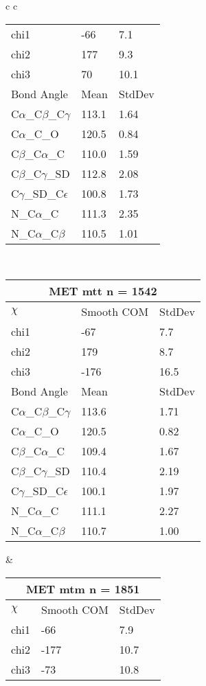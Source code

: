 \begin{longtable}{ c c }
\begin{tabular}{ l l l }
  chi1 & -66 & 7.1 \\ 
  chi2 & 177 & 9.3 \\ 
  chi3 & 70 & 10.1 \\ \midrule
  Bond Angle   & Mean     & StdDev \\ \midrule
  C$\alpha$\_C$\beta$\_C$\gamma$ & 113.1 & 1.64\\
  C$\alpha$\_C\_O & 120.5 & 0.84\\
  C$\beta$\_C$\alpha$\_C & 110.0 & 1.59\\
  C$\beta$\_C$\gamma$\_SD & 112.8 & 2.08\\
  C$\gamma$\_SD\_C$\epsilon$ & 100.8 & 1.73\\
  N\_C$\alpha$\_C & 111.3 & 2.35\\
  N\_C$\alpha$\_C$\beta$ & 110.5 & 1.01\\
  \bottomrule
  \end{tabular}
  \\
  \begin{tabular}{ l l l }
  \toprule
  \multicolumn{3}{c}{MET \textbf{mtt} n = 1542} \\ \toprule
  $\chi$       & Smooth COM & StdDev \\ \midrule
  chi1 & -67 & 7.7 \\ 
  chi2 & 179 & 8.7 \\ 
  chi3 & -176 & 16.5 \\ \midrule
  Bond Angle   & Mean     & StdDev \\ \midrule
  C$\alpha$\_C$\beta$\_C$\gamma$ & 113.6 & 1.71\\
  C$\alpha$\_C\_O & 120.5 & 0.82\\
  C$\beta$\_C$\alpha$\_C & 109.4 & 1.67\\
  C$\beta$\_C$\gamma$\_SD & 110.4 & 2.19\\
  C$\gamma$\_SD\_C$\epsilon$ & 100.1 & 1.97\\
  N\_C$\alpha$\_C & 111.1 & 2.27\\
  N\_C$\alpha$\_C$\beta$ & 110.7 & 1.00\\
  \bottomrule
  \end{tabular}
  &
  \begin{tabular}{ l l l }
  \toprule
  \multicolumn{3}{c}{MET \textbf{mtm} n = 1851} \\ \toprule
  $\chi$       & Smooth COM & StdDev \\ \midrule
  chi1 & -66 & 7.9 \\ 
  chi2 & -177 & 10.7 \\ 
  chi3 & -73 & 10.8 \\ \midrule

\end{tabular}
\end{longtable}
